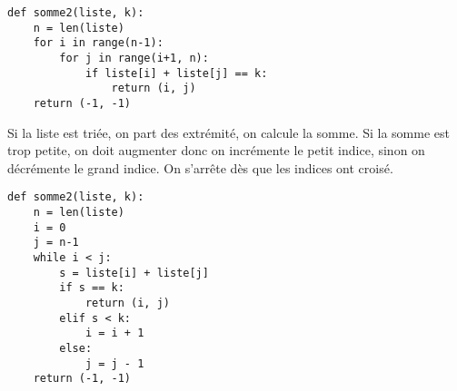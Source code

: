 \begin{Answer}
\begin{lstlisting}
def somme2(liste, k):
    n = len(liste)
    for i in range(n-1):
        for j in range(i+1, n):
            if liste[i] + liste[j] == k:
                return (i, j)
    return (-1, -1)
\end{lstlisting}

Si la liste est triée, on part des extrémité, on calcule la somme. Si la somme est trop petite, on doit augmenter donc on incrémente le petit indice, sinon on décrémente le grand indice. On s'arrête dès que les indices ont croisé.
\begin{lstlisting}
def somme2(liste, k):
    n = len(liste)
    i = 0
    j = n-1
    while i < j:
        s = liste[i] + liste[j]
        if s == k:
            return (i, j)
        elif s < k:
            i = i + 1
        else:
            j = j - 1
    return (-1, -1)
\end{lstlisting}
\end{Answer}


